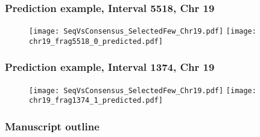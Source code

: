 \documentclass[10pt,dvipsnames,table]{beamer}
\begin{document}
\begin{frame}
\frametitle{Prediction example, Interval 5518, Chr 19}
\begin{figure}
\texttt{[image: SeqVsConsensus\_SelectedFew\_Chr19.pdf]}
\pause
\texttt{[image: chr19\_frag5518\_0\_predicted.pdf]}
\end{figure}
\end{frame}

\begin{frame}
\frametitle{Prediction example, Interval 1374, Chr 19}
\begin{figure}
\texttt{[image: SeqVsConsensus\_SelectedFew\_Chr19.pdf]}
\pause
\texttt{[image: chr19\_frag1374\_1\_predicted.pdf]}
\end{figure}
\end{frame}

\begin{frame}
\frametitle{Manuscript outline}

\end{frame}
\end{document}
